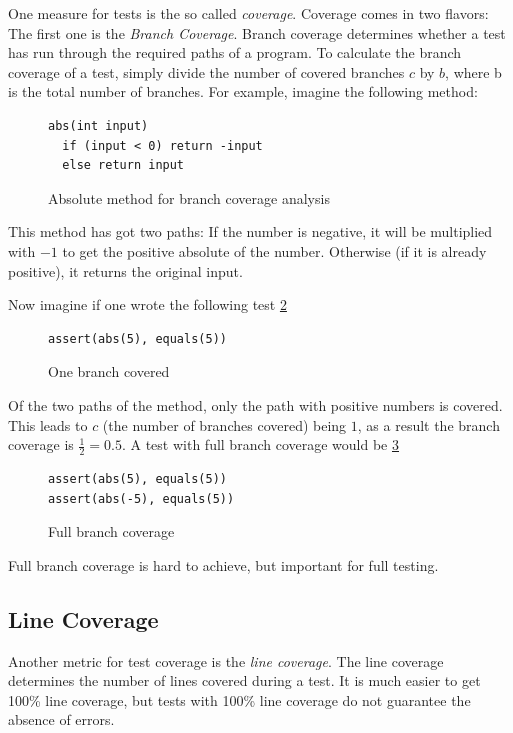 One measure for tests is the so called \textit{coverage}. Coverage
comes in two flavors: The first one is the \textit{Branch Coverage}.
Branch coverage determines whether a test has run through the
required paths of a program. To calculate the branch coverage of a test,
simply divide the number of covered branches $c$ by $b$, where b is the
total number of branches. For example, imagine the following
method:

\begin{figure}
\begin{lstlisting}
abs(int input)
  if (input < 0) return -input
  else return input
\end{lstlisting}
\caption{Absolute method for branch coverage analysis}
\label{code:branchCoverage}
\end{figure}

This method has got two paths: If the number is negative, it will
be multiplied with $-1$ to get the positive absolute of the number.
Otherwise (if it is already positive), it returns the original input.

Now imagine if one wrote the following test \ref{code:oneBranch}

\begin{figure}
\begin{lstlisting}
assert(abs(5), equals(5))
\end{lstlisting}
\caption{One branch covered}
\label{code:oneBranch}
\end{figure}

Of the two paths of the method, only the path with positive numbers is
covered. This leads to $c$ (the number of branches covered) being $1$,
as a result the branch coverage is $\frac{1}{2} = 0.5$. A test with
full branch coverage would be \ref{code:fullBranch}

\begin{figure}
\begin{lstlisting}
assert(abs(5), equals(5))
assert(abs(-5), equals(5))
\end{lstlisting}
\caption{Full branch coverage}
\label{code:fullBranch}
\end{figure}

Full branch coverage is hard to achieve, but important for full testing.

\subsection{Line Coverage}

Another metric for test coverage is the \textit{line coverage}. The line
coverage determines the number of lines covered during a test. It is much
easier to get 100\% line coverage, but tests with 100\% line coverage do
not guarantee the absence of errors.

